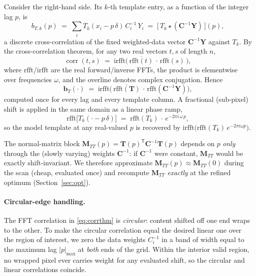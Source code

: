 \documentclass[11pt]{article}
\newcommand{\T}{\mathsf{T}}                    %
\newcommand{\rfft}{\mathrm{rfft}}
\newcommand{\irfft}{\mathrm{irfft}}
\begin{document}
Consider the right-hand side. Its $k$-th template entry, as a function of the
integer lag $p$, is
\begin{equation}
  b_{T,k}(p) \;=\; \sum_{i} T_k(x_i - p\,\delta)\,C_i^{-1}\,Y_i
  \;=\; \big[\,T_k \star (\mathbf{C}^{-1}\mathbf{Y})\,\big](p),
  \label{eq:bTcorr}
\end{equation}
a discrete cross-correlation of the fixed weighted-data vector $\mathbf{C}^{-1}\mathbf{Y}$
against $T_k$. By the cross-correlation theorem, for any two real vectors
$t,s$ of length $n$,
\begin{equation}
  \operatorname{corr}(t,s)\;=\;\irfft\!\big(\,\overline{\rfft(t)}\,\cdot\,\rfft(s)\,\big),
  \label{eq:corrthm}
\end{equation}
where $\rfft$/$\irfft$ are the real forward/inverse FFTs, the product is
elementwise over frequencies $\omega$, and the overline denotes complex
conjugation. Hence
\begin{equation}
  \mathbf{b}_T(\cdot)\;=\;\irfft\!\Big(\,\overline{\rfft(\mathbf{T})}\,\cdot\,\rfft(\mathbf{C}^{-1}\mathbf{Y})\Big),
  \label{eq:bTfft}
\end{equation}
computed once for every lag and every template column. A fractional (sub-pixel)
shift is applied in the same domain as a linear phase ramp,
\begin{equation}
  \rfft\!\big[T_k(\cdot - p\,\delta)\big]
  \;=\; \rfft(T_k)\,\cdot\,e^{-2\pi i\,\omega\,p},
  \label{eq:phaseramp}
\end{equation}
so the model template at any real-valued $p$ is recovered by
$\irfft\!\big(\rfft(T_k)\,e^{-2\pi i\omega p}\big)$.

The normal-matrix block $\mathbf{M}_{TT}(p)=\mathbf{T}(p)^\T\mathbf{C}^{-1}\mathbf{T}(p)$
depends on $p$ \emph{only} through the (slowly varying) weights $\mathbf{C}^{-1}$: if
$\mathbf{C}^{-1}$ were constant, $\mathbf{M}_{TT}$ would be exactly shift-invariant.
We therefore approximate $\mathbf{M}_{TT}(p)\approx\mathbf{M}_{TT}(0)$ during the
scan (cheap, evaluated once) and recompute $\mathbf{M}_{TT}$ \emph{exactly} at the
refined optimum (Section~\ref{sec:opt}).

\paragraph{Circular-edge handling.}
The FFT correlation in \eqref{eq:corrthm} is \emph{circular}: content shifted off
one end wraps to the other. To make the circular correlation equal the desired
linear one over the region of interest, we zero the data weights $C_i^{-1}$ in a band
of width equal to the maximum lag $|p|_{\max}$ at \emph{both} ends of the grid.
Within the interior valid region, no wrapped pixel ever carries weight for any
evaluated shift, so the circular and linear correlations coincide.
\end{document}
